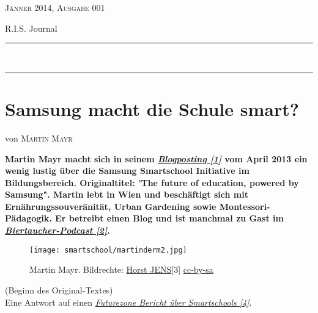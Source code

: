 \documentclass[10pt,a4paper,ngerman,twoside]{article} %
\newcommand{\HorRule}[1]{\noindent\rule{\linewidth}{#1}} %
\newcommand{\NewsletterName}[1]{ %
\begin{center}
\Huge \usefont{T1}{fvs}{b}{n} %
#1
\end{center}	
\par \normalsize \normalfont}
\newcommand{\JournalIssue}[1]{ %
\hfill \textsc{Jänner 2014, Ausgabe 001}
\par \normalsize \normalfont}
\newcommand{\NewsItem}[1]{ %
\usefont{T1}{fvs}{n}{n} %
\vspace{24pt}\large #1\vspace{3pt} %
\par \normalsize \normalfont}
\newcommand{\NewsAuthor}[1]{ %
\hfill von \textsc{#1} \vspace{20pt} %
\par \normalfont}
\begin{document}
\JournalIssue{1} %
\NewsletterName{R.I.S. Journal} %
\noindent\HorRule{3pt} \\[-0.75\baselineskip] %
\HorRule{1pt} %




%
  
\NewsItem{}
\section*{Samsung macht die Schule smart?}
\label{smartschool}
\NewsAuthor{Martin Mayr}

\textbf{Martin Mayr macht sich in seinem \href{http://martinslangweiligesblog.wordpress.com/2013/04/01/the-future-of-education-powered-by-samsung/}{\textit{Blogposting [1]}} vom April 2013 ein wenig lustig über die Samsung Smartschool Initiative im Bildungsbereich. Originaltitel: 'The future of education, powered by Samsung". Martin lebt in Wien und beschäftigt sich mit Ernährungssouveränität, Urban Gardening sowie Montessori-Pädagogik. Er betreibt einen Blog und ist manchmal zu Gast im \href{http://biertaucher.at}{\textit{Biertaucher-Podcast [2]}}.}

\begin{figure}
\texttt{[image: smartschool/martinderm2.jpg]} \\
\caption{Martin Mayr. Bildrechte: \href{http://spielend-programmieren.at}{Horst JENS}[3] \href{http://creativecommons.org/licenses/by-sa/3.0/}{cc-by-sa}}
\end{figure}

(Beginn des Original-Textes)\\

Eine Antwort auf einen \href{http://futurezone.at/digital-life/ideenwettbewerb-einreichen-und-abstimmen/24.593.816}{\textit{Futurezone Bericht über Smartschools [4]}}.
\end{document}
